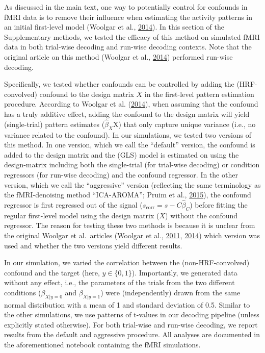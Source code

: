 \documentclass[11pt,american,a4paper,oneside,]{memoir} %
\begin{document}
As discussed in the main text, one way to potentially control for confounds in fMRI data is to remove their influence when estimating the activity patterns in an initial first-level model (Woolgar et al., \protect\hyperlink{ref-Woolgar2014-jb}{2014}). In this section of the Supplementary methods, we tested the efficacy of this method on simulated fMRI data in both trial-wise decoding and run-wise decoding contexts. Note that the original article on this method (Woolgar et al., \protect\hyperlink{ref-Woolgar2014-jb}{2014}) performed run-wise decoding.

Specifically, we tested whether confounds can be controlled by adding the (HRF-convolved) confound to the design matrix \(X\) in the first-level pattern estimation procedure. According to Woolgar et al. (\protect\hyperlink{ref-Woolgar2014-jb}{2014}), when assuming that the confound has a truly additive effect, adding the confound to the design matrix will yield (single-trial) pattern estimates (\(\hat{\beta}_{X}\)X) that only capture unique variance (i.e., no variance related to the confound). In our simulations, we tested two versions of this method. In one version, which we call the ``default'' version, the confound is added to the design matrix and the (GLS) model is estimated on using the design-matrix including both the single-trial (for trial-wise decoding) or condition regressors (for run-wise decoding) and the confound regressor. In the other version, which we call the ``aggressive'' version (reflecting the same terminology as the fMRI-denoising method ``ICA-AROMA''; Pruim et al., \protect\hyperlink{ref-pruim2015ica}{2015}), the confound regressor is first regressed out of the signal (\(s_{\mathrm{corr}} = s- C\hat{\beta}_{C}\)) before fitting the regular first-level model using the design matrix (\(X\)) without the confound regressor. The reason for testing these two methods is because it is unclear from the original Woolgar et al.~articles (Woolgar et al., \protect\hyperlink{ref-woolgar2011multi}{2011}, \protect\hyperlink{ref-Woolgar2014-jb}{2014}) which version was used and whether the two versions yield different results.

In our simulation, we varied the correlation between the (non-HRF-convolved) confound and the target (here, \(y \in \{0,1\}\)). Importantly, we generated data without any effect, i.e., the parameters of the trials from the two different conditions (\(\beta_{X | y = 0}\) and \(\beta_{X | y = 1}\)) were (independently) drawn from the same normal distribution with a mean of 1 and standard deviation of 0.5. Similar to the other simulations, we use patterns of t-values in our decoding pipeline (unless explicitly stated otherwise). For both trial-wise and run-wise decoding, we report results from the default and aggressive procedure. All analyses are documented in the aforementioned notebook containing the fMRI simulations.
\end{document}
